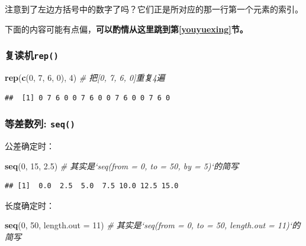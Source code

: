 \documentclass[]{book}
\newenvironment{Shaded}{\begin{snugshade}}{\end{snugshade}}
\newcommand{\CommentTok}[1]{\textcolor[rgb]{0.56,0.35,0.01}{\textit{#1}}}
\newcommand{\DataTypeTok}[1]{\textcolor[rgb]{0.13,0.29,0.53}{#1}}
\newcommand{\DecValTok}[1]{\textcolor[rgb]{0.00,0.00,0.81}{#1}}
\newcommand{\FloatTok}[1]{\textcolor[rgb]{0.00,0.00,0.81}{#1}}
\newcommand{\KeywordTok}[1]{\textcolor[rgb]{0.13,0.29,0.53}{\textbf{#1}}}
\newcommand{\NormalTok}[1]{#1}
\begin{document}
注意到了左边方括号中的数字了吗？它们正是所对应的那一行第一个元素的索引。

下面的内容可能有点偏，\textbf{可以酌情从这里跳到第\ref{youyuexing}节。}

\hypertarget{rep}{%
\subsubsection{\texorpdfstring{复读机\texttt{rep()}}{复读机rep()}}\label{rep}}

\begin{Shaded}
\begin{Highlighting}[]
\KeywordTok{rep}\NormalTok{(}\KeywordTok{c}\NormalTok{(}\DecValTok{0}\NormalTok{, }\DecValTok{7}\NormalTok{, }\DecValTok{6}\NormalTok{, }\DecValTok{0}\NormalTok{), }\DecValTok{4}\NormalTok{) }\CommentTok{# 把[0, 7, 6, 0]重复4遍}
\end{Highlighting}
\end{Shaded}

\begin{verbatim}
##  [1] 0 7 6 0 0 7 6 0 0 7 6 0 0 7 6 0
\end{verbatim}

\hypertarget{-seq}{%
\subsubsection{\texorpdfstring{等差数列: \texttt{seq()}}{等差数列: seq()}}\label{-seq}}

公差确定时：

\begin{Shaded}
\begin{Highlighting}[]
\KeywordTok{seq}\NormalTok{(}\DecValTok{0}\NormalTok{, }\DecValTok{15}\NormalTok{, }\FloatTok{2.5}\NormalTok{) }\CommentTok{# 其实是`seq(from = 0, to = 50, by = 5)`的简写}
\end{Highlighting}
\end{Shaded}

\begin{verbatim}
## [1]  0.0  2.5  5.0  7.5 10.0 12.5 15.0
\end{verbatim}

长度确定时：

\begin{Shaded}
\begin{Highlighting}[]
 \KeywordTok{seq}\NormalTok{(}\DecValTok{0}\NormalTok{, }\DecValTok{50}\NormalTok{, }\DataTypeTok{length.out =} \DecValTok{11}\NormalTok{) }\CommentTok{# 其实是`seq(from = 0, to = 50, length.out = 11)`的简写}
\end{Highlighting}
\end{Shaded}
\end{document}
